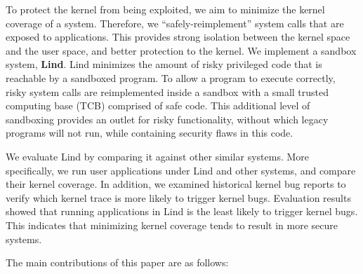 To protect the kernel from being exploited, we aim to minimize the 
kernel coverage of a system. Therefore, we ``safely-reimplement'' 
system calls that are exposed to applications. 
This provides strong isolation between the kernel space and the user space, 
and better protection to the kernel. %
We implement a sandbox system, \textbf{Lind}.
Lind minimizes the amount of risky privileged code that is reachable by a
sandboxed program.  To allow a program to %
execute correctly, risky system calls are reimplemented inside a sandbox with
a small trusted computing base (TCB) comprised of safe code. 
This additional level of sandboxing provides an outlet for risky functionality, without which
legacy programs will not run, while containing security flaws in this code. 

We evaluate Lind by comparing it against other similar systems.
More specifically, we run user applications
under Lind and other systems, and compare their kernel coverage. In addition, we examined historical
kernel bug reports to verify which kernel trace is more likely to trigger 
kernel bugs. 
Evaluation results showed that running applications in Lind is the least likely to trigger kernel bugs. 
This indicates that minimizing kernel coverage tends to result in more secure systems. 

The main contributions of this paper are as follows:

